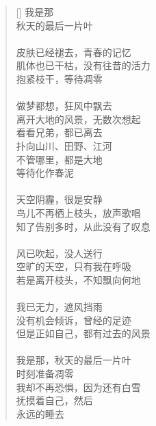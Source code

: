 \renewcommand{\poemtoc}{section}
\settowidth{\versewidth}{做梦都想，狂风中飘去}
\begin{verse}[\versewidth]
我是那\\
秋天的最后一片叶\\
~\\
皮肤已经褪去，青春的记忆\\
肌体也已干枯，没有往昔的活力\\
抱紧枝干，等待凋零\\
~\\
做梦都想，狂风中飘去\\
离开大地的风景，无数次想起\\
看看兄弟，都已离去\\
扑向山川、田野、江河\\
不管哪里，都是大地\\
等待化作春泥\\
~\\
天空阴霾，很是安静\\
鸟儿不再栖上枝头，放声歌唱\\
知了告别多时，从此没有了叹息\\
~\\
风已吹起，没人送行\\
空旷的天空，只有我在呼吸\\
若是离开枝头，不知飘向何地\\
~\\
我已无力，遮风挡雨\\
没有机会倾诉，曾经的足迹\\
但是正如自己，都有过去的风景\\
~\\
我是那，秋天的最后一片叶\\
时刻准备凋零\\
我却不再恐惧，因为还有白雪\\
抚摸着自己，然后\\
永远的睡去
\end{verse}
